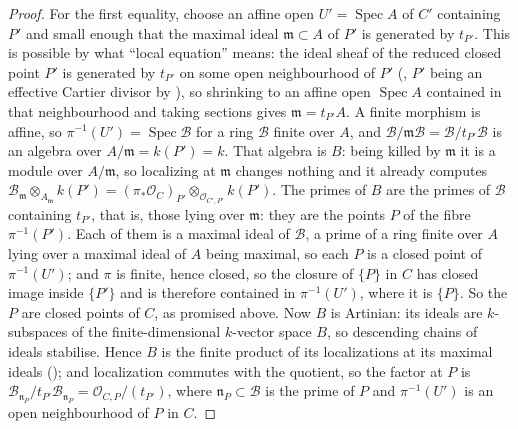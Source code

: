 \begin{proof}
For the first equality, choose an affine open
\(U'=\operatorname{Spec}A\) of \(C'\) containing \(P'\) and small enough
that the maximal ideal \(\mathfrak m\subset A\) of \(P'\) is generated
by \(t_{P'}\).  This is possible by what ``local equation'' means: the
ideal sheaf of the reduced closed point \(P'\) is generated by
\(t_{P'}\) on some open neighbourhood of \(P'\)
(, \(P'\) being an effective
Cartier divisor by ), so shrinking to an
affine open \(\operatorname{Spec}A\) contained in that neighbourhood
and taking sections gives \(\mathfrak m=t_{P'}A\).  A finite
morphism is affine, so \(\pi^{-1}(U')=\operatorname{Spec}\mathcal B\)
for a ring \(\mathcal B\) finite over \(A\), and
\(\mathcal B/\mathfrak m\mathcal B=\mathcal B/t_{P'}\mathcal B\) is an
algebra over \(A/\mathfrak m=k(P')=k\).  That algebra is \(B\): being
killed by \(\mathfrak m\) it is a module over \(A/\mathfrak m\), so
localizing at \(\mathfrak m\) changes nothing and it already computes
\(\mathcal B_{\mathfrak m}\otimes_{A_{\mathfrak m}}k(P')
=(\pi_*\mathcal O_C)_{P'}\otimes_{\mathcal O_{C',P'}}k(P')\).
The primes of \(B\) are the primes of \(\mathcal B\) containing
\(t_{P'}\), that is, those lying over \(\mathfrak m\): they are the
points \(P\) of the fibre \(\pi^{-1}(P')\).  Each of them is a maximal
ideal of \(\mathcal B\), a prime of a ring finite over \(A\) lying over
a maximal ideal of \(A\) being maximal, so each \(P\) is a closed point
of \(\pi^{-1}(U')\); and \(\pi\) is finite, hence closed, so the
closure of \(\{P\}\) in \(C\) has closed image inside \(\{P'\}\) and is
therefore contained in \(\pi^{-1}(U')\), where it is \(\{P\}\).  So the
\(P\) are closed points of \(C\), as promised above.
Now \(B\) is Artinian: its ideals are \(k\)-subspaces of the
finite-dimensional \(k\)-vector space \(B\), so descending chains of
ideals stabilise.  Hence \(B\) is the finite product of its
localizations at its maximal ideals
(); and localization commutes with
the quotient, so the factor at \(P\) is
\(\mathcal B_{\mathfrak n_P}/t_{P'}\mathcal B_{\mathfrak n_P}
=\mathcal O_{C,P}/(t_{P'})\), where \(\mathfrak n_P\subset\mathcal B\)
is the prime of \(P\) and \(\pi^{-1}(U')\) is an open neighbourhood of
\(P\) in \(C\).


\end{proof}
